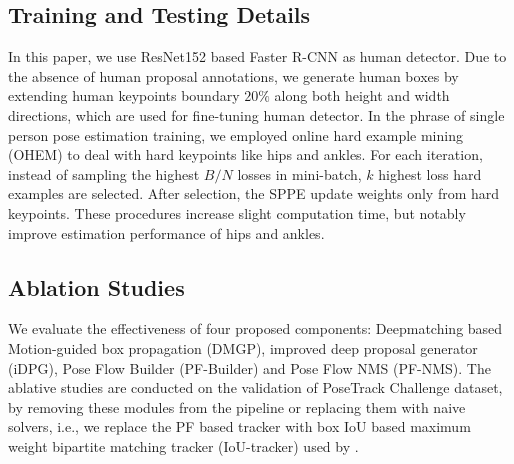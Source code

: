 \documentclass{bmvc2k}
\begin{document}
\subsection{Training and Testing Details}
In this paper, we use ResNet152 based Faster R-CNN as human detector. Due to the absence of human proposal annotations, we generate human boxes by extending human keypoints boundary $20\%$ along both height and width directions, which are used for fine-tuning human detector. In the phrase of single person pose estimation training, we employed online hard example mining (OHEM) to deal with hard keypoints like hips and ankles. For each iteration, instead of sampling the highest $B/N$ losses in mini-batch, $k$ highest loss hard examples are selected. After selection, the SPPE update weights only from hard keypoints. These procedures increase slight computation time, but notably improve estimation performance of hips and ankles.

\subsection{Ablation Studies}
We evaluate the effectiveness of four proposed components: Deepmatching based Motion-guided box propagation (DMGP), improved deep proposal generator (iDPG), Pose Flow Builder (PF-Builder) and Pose Flow NMS (PF-NMS). The ablative studies are conducted on the validation of PoseTrack Challenge dataset, by removing these modules from the pipeline or replacing them with naive solvers, i.e., we replace the PF based tracker with box IoU based maximum weight bipartite matching tracker (IoU-tracker) used by \cite{girdhar2017detect}.

\vspace{-2mm}
\begin{table}[!ht]
\centering
{}
\vspace{4mm}
\caption{Ablation comparison. ``IoU-Tracker'' means naive box IoU based matching tracker used by \cite{girdhar2017detect}. ``w/o PF-NMS'' means only using PF-Builder without PF-NMS. ``w/o DMGP'' means removing motion-guided box propagation. ``w/o iDPG'' means without improved deep proposal generator.}
\label{Ablation}
\end{table}
\vspace{-2mm}
\end{document}
